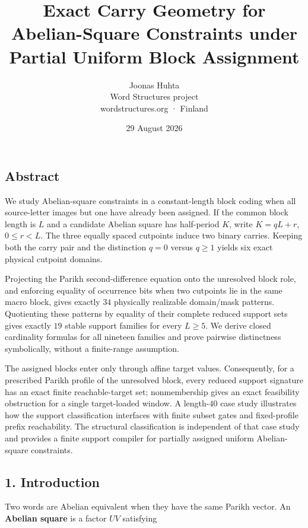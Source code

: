 \documentclass[
  british,
  a4paper,
  11pt]{article}
\title{Exact Carry Geometry for Abelian-Square Constraints under Partial
Uniform Block Assignment}
\author{Joonas Huhta\\
Word Structures project\\
wordstructures.org · Finland}
\date{29 August 2026}
\begin{document}
\maketitle

\subsection*{Abstract}\label{abstract}

We study Abelian-square constraints in a constant-length block coding
when all source-letter images but one have already been assigned. If the
common block length is \(L\) and a candidate Abelian square has
half-period \(K\), write \(K=qL+r\), \(0\le r<L\). The three equally
spaced cutpoints induce two binary carries. Keeping both the carry pair
and the distinction \(q=0\) versus \(q\ge1\) yields six exact physical
cutpoint domains.

Projecting the Parikh second-difference equation onto the unresolved
block role, and enforcing equality of occurrence bits when two cutpoints
lie in the same macro block, gives exactly \(34\) physically realizable
domain/mask patterns. Quotienting these patterns by equality of their
complete reduced support sets gives exactly \(19\) stable support
families for every \(L\ge5\). We derive closed cardinality formulas for
all nineteen families and prove pairwise distinctness symbolically,
without a finite-range assumption.

The assigned blocks enter only through affine target values.
Consequently, for a prescribed Parikh profile of the unresolved block,
every reduced support signature has an exact finite reachable-target
set; nonmembership gives an exact feasibility obstruction for a single
target-loaded window. A length-\(40\) case study illustrates how the
support classification interfaces with finite subset gates and
fixed-profile prefix reachability. The structural classification is
independent of that case study and provides a finite support compiler
for partially assigned uniform Abelian-square constraints.

\subsection{1. Introduction}\label{introduction}

Two words are Abelian equivalent when they have the same Parikh vector.
An \textbf{Abelian square} is a factor \(UV\) satisfying
\end{document}

